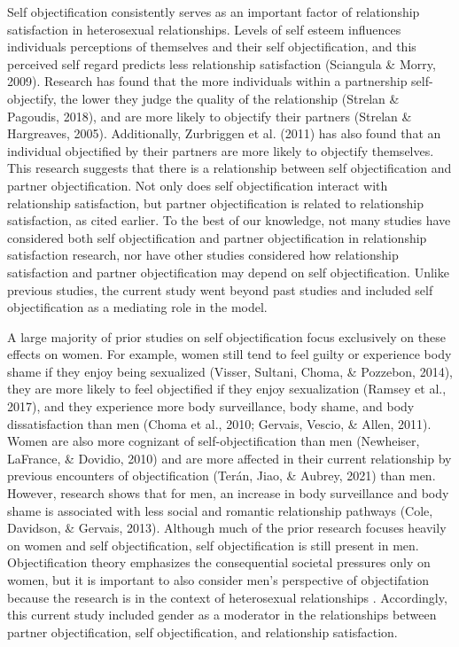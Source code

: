 \documentclass[
  man]{apa6}
\begin{document}
Self objectification consistently serves as an important factor of relationship satisfaction in heterosexual relationships. Levels of self esteem influences individuals perceptions of themselves and their self objectification, and this perceived self regard predicts less relationship satisfaction (Sciangula \& Morry, 2009). Research has found that the more individuals within a partnership self-objectify, the lower they judge the quality of the relationship (Strelan \& Pagoudis, 2018), and are more likely to objectify their partners (Strelan \& Hargreaves, 2005). Additionally, Zurbriggen et al. (2011) has also found that an individual objectified by their partners are more likely to objectify themselves. This research suggests that there is a relationship between self objectification and partner objectification. Not only does self objectification interact with relationship satisfaction, but partner objectification is related to relationship satisfaction, as cited earlier. To the best of our knowledge, not many studies have considered both self objectification and partner objectification in relationship satisfaction research, nor have other studies considered how relationship satisfaction and partner objectification may depend on self objectification. Unlike previous studies, the current study went beyond past studies and included self objectification as a mediating role in the model.

A large majority of prior studies on self objectification focus exclusively on these effects on women. For example, women still tend to feel guilty or experience body shame if they enjoy being sexualized (Visser, Sultani, Choma, \& Pozzebon, 2014), they are more likely to feel objectified if they enjoy sexualization (Ramsey et al., 2017), and they experience more body surveillance, body shame, and body dissatisfaction than men (Choma et al., 2010; Gervais, Vescio, \& Allen, 2011). Women are also more cognizant of self-objectification than men (Newheiser, LaFrance, \& Dovidio, 2010) and are more affected in their current relationship by previous encounters of objectification (Terán, Jiao, \& Aubrey, 2021) than men. However, research shows that for men, an increase in body surveillance and body shame is associated with less social and romantic relationship pathways (Cole, Davidson, \& Gervais, 2013). Although much of the prior research focuses heavily on women and self objectification, self objectification is still present in men. Objectification theory emphasizes the consequential societal pressures only on women, but it is important to also consider men's perspective of objectifation because the research is in the context of heterosexual relationships . Accordingly, this current study included gender as a moderator in the relationships between partner objectification, self objectification, and relationship satisfaction.
\end{document}
